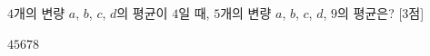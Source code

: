 $4$개의 변량 $a$, $b$, $c$, $d$의 평균이 $4$일 때, $5$개의 변량 $a$, $b$, $c$, $d$, $9$의 평균은? \mbox{[3점]}
\begin{choices32}{$4$}{$5$}{$6$}{$7$}{$8$}\end{choices32}
